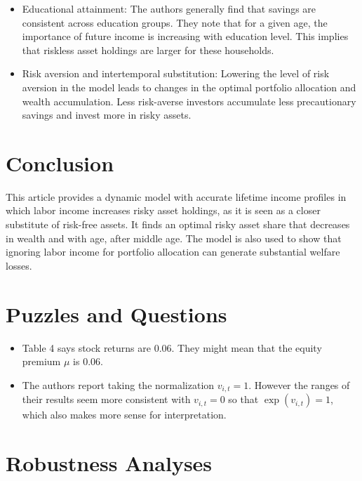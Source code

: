 \documentclass[./CGMPort.tex]{subfiles}
\begin{document}
\begin{itemize}
	\item Educational attainment: The authors generally find that savings are consistent across education groups. They note that for a given age, the importance of future income is increasing with education level. This implies that riskless asset holdings are larger for these households.
	\item Risk aversion and intertemporal substitution: Lowering the level of risk aversion in the model leads to changes in the optimal portfolio allocation and wealth accumulation. Less risk-averse investors accumulate less precautionary savings and invest more in risky assets.
\end{itemize}

\hypertarget{Conclusion}{}
\section{Conclusion}

This article provides a dynamic model with accurate lifetime income profiles in which labor income increases risky asset holdings, as it is seen as a closer substitute of risk-free assets. It finds an optimal risky asset share that decreases in wealth and with age, after middle age. The model is also used to show that ignoring labor income for portfolio allocation can generate substantial welfare losses.

\hypertarget{Puzzles-and-Questions}{}
\section{Puzzles and Questions}\label{sec:Puzzles}
\begin{itemize}
	\item Table 4 says stock returns are $0.06$. They might mean that the equity premium $\mu$ is $0.06$.
	\item The authors report taking the normalization $v_{i,t} = 1$. However the ranges of their results seem more consistent with $v_{i,t} = 0$ so that $\exp (v_{i,t}) = 1$, which also makes more sense for interpretation.
\end{itemize}

\hypertarget{Robustness Analyses}{}
\section{Robustness Analyses}
\end{document}
